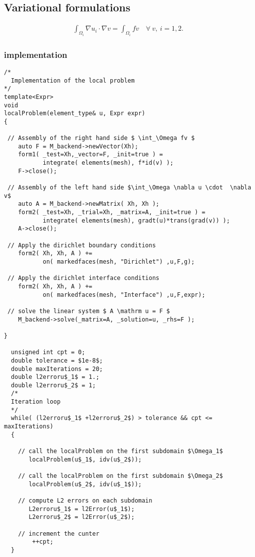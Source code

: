 \subsection{Variational formulations}
\label{sec:vari-form-2}

\begin{equation*}
  \begin{aligned}
    \int_{\Omega_i} \nabla u_i \cdot \nabla v = \int_{\Omega_i} fv   \quad \forall~ v,~i=1,2.
  \end{aligned}
\end{equation*}

\subsubsection{\FEEL implementation}
\label{sec:feel-implementation}
\begin{lstlisting}
/*
  Implementation of the local problem
*/
template<Expr>
void
localProblem(element_type& u, Expr expr)
{

 // Assembly of the right hand side $ \int_\Omega fv $
    auto F = M_backend->newVector(Xh);
    form1( _test=Xh,_vector=F, _init=true ) =
           integrate( elements(mesh), f*id(v) );
    F->close();

 // Assembly of the left hand side $\int_\Omega \nabla u \cdot  \nabla v$
    auto A = M_backend->newMatrix( Xh, Xh );
    form2( _test=Xh, _trial=Xh, _matrix=A, _init=true ) =
           integrate( elements(mesh), gradt(u)*trans(grad(v)) );
    A->close();

 // Apply the dirichlet boundary conditions
    form2( Xh, Xh, A ) +=
           on( markedfaces(mesh, "Dirichlet") ,u,F,g);

 // Apply the dirichlet interface conditions
    form2( Xh, Xh, A ) +=
           on( markedfaces(mesh, "Interface") ,u,F,expr);

 // solve the linear system $ A \mathrm u = F $
    M_backend->solve(_matrix=A, _solution=u, _rhs=F );

}

  unsigned int cpt = 0;
  double tolerance = $1e-8$;
  double maxIterations = 20;
  double l2erroru$_1$ = 1.;
  double l2erroru$_2$ = 1;
  /*
  Iteration loop
  */
  while( (l2erroru$_1$ +l2erroru$_2$) > tolerance && cpt <= maxIterations)
  {

    // call the localProblem on the first subdomain $\Omega_1$
       localProblem(u$_1$, idv(u$_2$));

    // call the localProblem on the first subdomain $\Omega_2$
       localProblem(u$_2$, idv(u$_1$));

    // compute L2 errors on each subdomain
       L2erroru$_1$ = l2Error(u$_1$);
       L2erroru$_2$ = l2Error(u$_2$);

    // increment the cunter
        ++cpt;
  }

\end{lstlisting}

